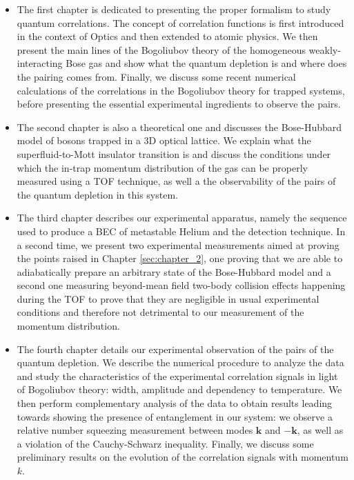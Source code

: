 \begin{itemize}
    \item The first chapter is dedicated to presenting the proper formalism to study quantum correlations. The concept of correlation functions is first introduced in the context of Optics and then extended to atomic physics. We then present the main lines of the Bogoliubov theory of the homogeneous weakly-interacting Bose gas and show what the quantum depletion is and where does the \kmk pairing comes from. Finally, we discuss some recent numerical calculations \cite{butera2020} of the correlations in the Bogoliubov theory for trapped systems, before presenting the essential experimental ingredients to observe the \kmk pairs.
    \item The second chapter is also a theoretical one and discusses the Bose-Hubbard model of bosons trapped in a 3D optical lattice. We explain what the superfluid-to-Mott insulator transition is and discuss the conditions under which the in-trap momentum distribution of the gas can be properly measured using a TOF technique, as well a the observability of the \kmk pairs of the quantum depletion in this system.
    \item The third chapter describes our experimental apparatus, namely the sequence used to produce a BEC of metastable Helium and the detection technique. In a second time, we present two experimental measurements aimed at proving the points raised in Chapter \ref{sec:chapter_2}, one proving that we are able to adiabatically prepare an arbitrary state of the Bose-Hubbard model and a second one measuring beyond-mean field two-body collision effects happening during the TOF to prove that they are negligible in usual experimental conditions and therefore not detrimental to our measurement of the momentum distribution. 
    \item The fourth chapter details our experimental observation of the \kmk pairs of the quantum depletion. We describe the numerical procedure to analyze the data and study the characteristics of the experimental correlation signals in light of Bogoliubov theory: width, amplitude and dependency to temperature. We then perform complementary analysis of the data to obtain results leading towards showing the presence of entanglement in our system: we observe a relative number squeezing measurement between modes $\bm{k}$ and $-\bm{k}$, as well as a violation of the Cauchy-Schwarz inequality. Finally, we discuss some preliminary results on the evolution of the correlation signals with momentum $k$.

\end{itemize}
